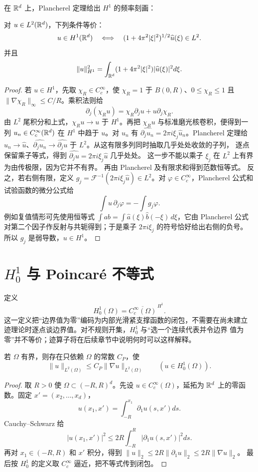 在 \(\mathbb{R}^d\) 上，Plancherel 定理给出 \(H^1\) 的频率刻画：
\begin{theorem}\label{thm:h-one-fourier-characterization}
对 \(u\in L^2(\mathbb{R}^d)\)，下列条件等价：
\[
 u\in H^1(\mathbb{R}^d)
 \quad\Longleftrightarrow\quad
 (1+4\pi^2|\xi|^2)^{1/2}\widehat u(\xi)\in L^2.
\]
并且
\[
 \|u\|_{H^1}^2
 =\int_{\mathbb{R}^d}(1+4\pi^2|\xi|^2)|\widehat u(\xi)|^2d\xi.
\]
\end{theorem}
\begin{proof}
若 \(u\in H^1\)，先取 \(\chi_R\in C_c^\infty\)，使
\(\chi_R=1\) 于 \(B(0,R)\)、\(0\le\chi_R\le1\) 且
\(\|\nabla\chi_R\|_\infty\le C/R\)。乘积法则给
\[
 \partial_j(\chi_Ru)=\chi_R\partial_ju+u\partial_j\chi_R.
\]
由 \(L^2\) 尾积分和上式，\(\chi_Ru\to u\) 于 \(H^1\)。再把
\(\chi_Ru\) 与标准磨光核卷积，便得到一列
\(u_n\in C_c^\infty(\mathbb{R}^d)\) 在 \(H^1\) 中趋于 \(u\)。对 \(u_n\) 有
\(\widehat{\partial_ju_n}=2\pi i\xi_j\widehat u_n\)。Plancherel 定理给
\(\widehat u_n\to\widehat u\)、\(\widehat{\partial_ju_n}\to
\widehat{\partial_ju}\) 于 \(L^2\)。从这有限多列同时抽取几乎处处收敛的子列，
逐点保留乘子等式，得到
\(\widehat{\partial_ju}=2\pi i\xi_j\widehat u\) 几乎处处。
这一步不能以乘子 \(\xi_j\) 在 \(L^2\) 上有界为由传极限，因为它并不有界。
再由 Plancherel 及有限求和得到范数恒等式。
反之，若右侧有限，定义
\(g_j=\mathcal F^{-1}(2\pi i\xi_j\widehat u)\in L^2\)。对
\(\varphi\in C_c^\infty\)，Plancherel 公式和试验函数的微分公式给
\[
 \int u\,\partial_j\varphi=-\int g_j\varphi.
\]
例如复值情形可先使用恒等式
\(\int ab=\int\widehat a(\xi)\widehat b(-\xi)\,d\xi\)，它由
Plancherel 公式对第二个因子作反射与共轭得到；于是乘子
\(2\pi i\xi_j\) 的符号恰好给出右侧的负号。
所以 \(g_j\) 是弱导数，\(u\in H^1\)。
\end{proof}

\section{\texorpdfstring{\(H_0^1\)}{H01} 与 Poincaré 不等式}

定义
\[
 H_0^1(\Omega)=\overline{C_c^\infty(\Omega)}^{\,H^1}.
\]
这一定义把“边界值为零”编码为内部光滑紧支撑函数的闭包，不需要在尚未建立
迹理论时逐点谈边界值。对不规则开集，\(H_0^1\) 与“选一个连续代表并令边界
值为零”并不等价；迹算子将在后续章节中说明何时可以这样解释。

\begin{theorem}\label{thm:poincare-hzero-one}
若 \(\Omega\) 有界，则存在只依赖 \(\Omega\) 的常数 \(C_P\)，使
\[
 \|u\|_{L^2(\Omega)}\le C_P\|\nabla u\|_{L^2(\Omega)}
 \qquad(u\in H_0^1(\Omega)).
\]
\end{theorem}
\begin{proof}
取 \(R>0\) 使 \(\Omega\subset(-R,R)^d\)。先设
\(u\in C_c^\infty(\Omega)\)，延拓为 \(\mathbb{R}^d\) 上的零函数。固定
\(x'=(x_2,\ldots,x_d)\)，
\[
 u(x_1,x')=\int_{-R}^{x_1}\partial_1u(s,x')ds.
\]
Cauchy--Schwarz 给
\[
 |u(x_1,x')|^2\le2R\int_{-R}^{R}|\partial_1u(s,x')|^2ds.
\]
再对 \(x_1\in(-R,R)\) 和 \(x'\) 积分，得到
\(\|u\|_2\le2R\|\partial_1u\|_2\le2R\|\nabla u\|_2\)。
最后按 \(H_0^1\) 的定义取 \(C_c^\infty\) 逼近，把不等式传到闭包。
\end{proof}

